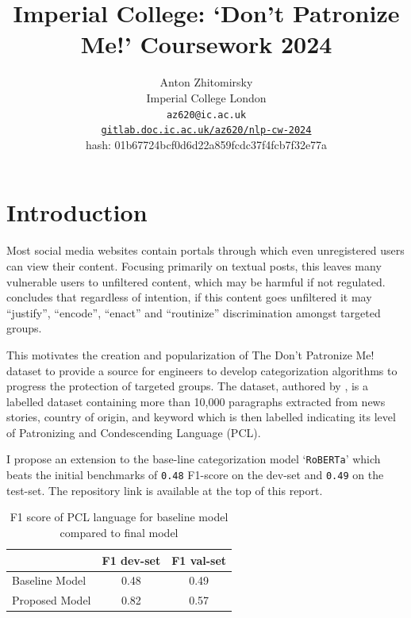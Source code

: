 \documentclass[11pt,a4paper]{article}
\title{Imperial College: `Don't Patronize Me!' Coursework 2024}
\author{Anton Zhitomirsky \\
  Imperial College London \\
  \texttt{az620@ic.ac.uk} \\
  \href{https://gitlab.doc.ic.ac.uk/az620/nlp-cw-2024}{\texttt{gitlab.doc.ic.ac.uk/az620/nlp-cw-2024}} \\
  hash: 01b67724bcf0d6d22a859fcdc37f4fcb7f32e77a \\ 
}
\begin{document}
\maketitle

\section{Introduction}


Most social media websites contain portals through which even unregistered users can view their content. Focusing primarily on textual posts, this leaves many vulnerable users to unfiltered content, which may be harmful if not regulated. \citet{Ng-discrimination} concludes that regardless of intention, if this content goes unfiltered it may ``justify'', ``encode'', ``enact'' and ``routinize'' discrimination amongst targeted groups.

This motivates the creation and popularization of The Don't Patronize Me! dataset to provide a source for engineers to develop categorization algorithms to progress the protection of targeted groups. The dataset, authored by \citet{perez-almendros-etal-2020-dont}, is a labelled dataset containing more than 10,000 paragraphs extracted from news stories, country of origin, and keyword which is then labelled indicating its level of Patronizing and Condescending Language (PCL).

I propose an extension to the base-line categorization model `\texttt{RoBERTa}' which beats the initial benchmarks of \texttt{0.48} F1-score on the dev-set and \texttt{0.49} on the test-set. The repository link is available at the top of this report.

\begin{table}[!h]
    \centering
    \begin{tabular}{|l||c|c|}
        \hline
         & F1 dev-set & F1 val-set \\
        \hline
        \hline
        Baseline Model & 0.48 & 0.49 \\
        \hline
        Proposed Model  & 0.82 & 0.57 \\
        \hline
    \end{tabular}
    \caption{F1 score of PCL language for baseline model compared to final model}    
\end{table}
\end{document}
